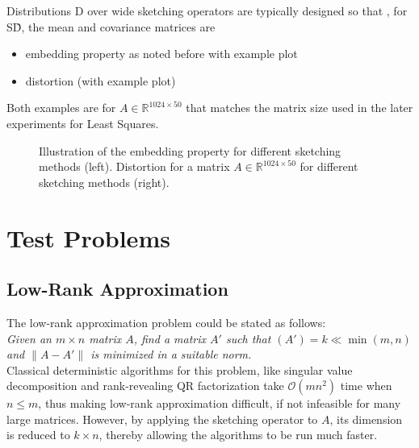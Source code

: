 \documentclass{article}
\newcommand{\bO}{\mathcal{O}}
\begin{document}
Distributions D over wide sketching operators are typically designed so that , for S\~ D, the mean and covariance matrices are 
\begin{itemize}
    \item embedding property as noted before with example plot
    \item distortion (with example plot)
\end{itemize}
Both examples are for $A \in \mathbb{R}^{1024 \times 50}$ that matches the matrix size used in the later experiments for Least Squares.


\begin{figure}[htb]
  \centering
  \begin{minipage}[t]{.49\linewidth}
    \centering
  \end{minipage}
  \begin{minipage}[t]{.49\linewidth}
    \centering
  \end{minipage}
  \caption{Illustration of the embedding property for different sketching methods (left). Distortion for a matrix $A \in \mathbb{R}^{1024 \times 50}$ for different sketching methods (right).}
  \label{fig:sketch_properties}
\end{figure}


\section{Test Problems}
\subsection{Low-Rank Approximation}
The low-rank approximation problem could be stated as follows:\\

\textit{Given an $m \times n$ matrix $A$, find a matrix $A'$ such that $(A') = k \ll \min(m, n)$ and $\| A - A'\|$ is minimized in a suitable norm.}\\

Classical deterministic algorithms for this problem, like singular value decomposition and rank-revealing QR factorization take $\bO(mn^2)$ time when $n \leq m$, thus making low-rank approximation difficult, if not infeasible for many large matrices. However, by applying the sketching operator to $A$, its dimension is reduced to $k \times n$, thereby allowing the algorithms to be run much faster. 
\end{document}
